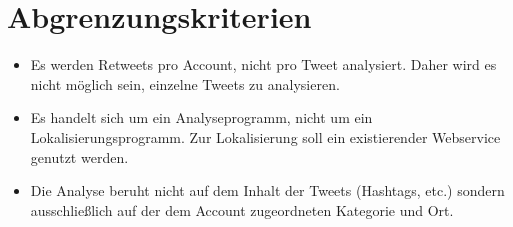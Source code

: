 \section{Abgrenzungskriterien}
\begin{itemize}
	\item Es werden Retweets pro Account, nicht pro Tweet analysiert. Daher wird es nicht möglich sein, einzelne Tweets zu analysieren.
	\item Es handelt sich um ein Analyseprogramm, nicht um ein Lokalisierungsprogramm. Zur Lokalisierung soll ein existierender Webservice genutzt werden.
	\item Die Analyse beruht nicht auf dem Inhalt der Tweets (Hashtags, etc.) sondern ausschließlich auf der dem Account zugeordneten Kategorie und Ort.
\end{itemize}
